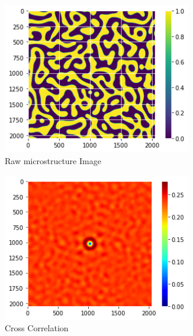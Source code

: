 \documentclass[12pt, a4paper]{report}
\begin{document}
\begin{figure}[H]
\centering
\begin{subfigure}{.45\textwidth}
  \centering
  \includegraphics[width=0.9\textwidth]{Pictures/2 Point/2_point_binary_image.jpeg}
  \caption{Raw microstructure Image}
  \label{img:microstrImg}
\end{subfigure}
\begin{subfigure}{.45\textwidth}
  \centering
  \includegraphics[width=0.9\textwidth]{Pictures/2 Point/2_point_stats_bw.jpeg}
  \caption{Cross Correlation}
  \label{img:microstrImg}
\end{subfigure}
\begin{subfigure}{.45\textwidth}
  \centering

\end{subfigure}
\end{figure}
\end{document}
